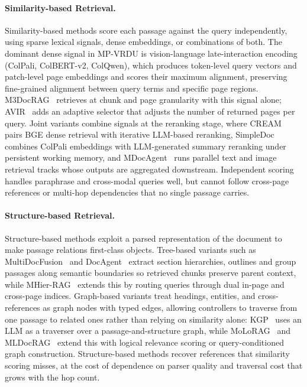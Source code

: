 \documentclass[11pt]{article}
\begin{document}
\paragraph{Similarity-based Retrieval.}
Similarity-based methods score each passage against the query independently, using sparse lexical signals, dense embeddings, or combinations of both. The dominant dense signal in MP-VRDU is vision-language late-interaction encoding (ColPali, ColBERT-v2, ColQwen), which produces token-level query vectors and patch-level page embeddings and scores their maximum alignment, preserving fine-grained alignment between query terms and specific page regions. M3DocRAG~\cite{cho2024m3docrag} retrieves at chunk and page granularity with this signal alone; AVIR~\cite{li2025avir} adds an adaptive selector that adjusts the number of returned pages per query. Joint variants combine signals at the reranking stage, where CREAM~\cite{zhang2024cream} pairs BGE dense retrieval with iterative LLM-based reranking, SimpleDoc~\cite{jain2025simpledoc} combines ColPali embeddings with LLM-generated summary reranking under persistent working memory, and MDocAgent~\cite{han2025mdocagent} runs parallel text and image retrieval tracks whose outputs are aggregated downstream. Independent scoring handles paraphrase and cross-modal queries well, but cannot follow cross-page references or multi-hop dependencies that no single passage carries.

\paragraph{Structure-based Retrieval.}
Structure-based methods exploit a parsed representation of the document to make passage relations first-class objects. Tree-based variants such as MultiDocFusion~\cite{shin2025multidocfusion} and DocAgent~\cite{sun2025docagent} extract section hierarchies, outlines and group passages along semantic boundaries so retrieved chunks preserve parent context, while MHier-RAG~\cite{gong2025mhier} extends this by routing queries through dual in-page and cross-page indices. Graph-based variants treat headings, entities, and cross-references as graph nodes with typed edges, allowing controllers to traverse from one passage to related ones rather than relying on similarity alone: KGP~\cite{wang2024knowledge} uses an LLM as a traverser over a passage-and-structure graph, while MoLoRAG~\cite{wu2025molorag} and MLDocRAG~\cite{zhang2026mldocrag} extend this with logical relevance scoring or query-conditioned graph construction. Structure-based methods recover references that similarity scoring misses, at the cost of dependence on parser quality and traversal cost that grows with the hop count.
\end{document}
